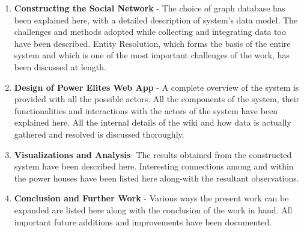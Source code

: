 \begin{enumerate}
    
    \item \textbf{Constructing the Social Network} -  The choice of graph database has been explained here, with a detailed description of system's data model. The challenges and methods adopted while collecting and integrating data too have been described. Entity Resolution, which forms the basis of the entire system and which is one of the most important challenges of the work, has been discussed at length.
    
    \item \textbf{Design of Power Elites Web App}  -  A complete overview of the system is provided with all the possible actors. All the components  of the system, their functionalities and interactions with the actors of the system have been explained here. All the internal details of the wiki and how data is actually gathered and resolved is discussed thoroughly.

    \item \textbf{Visualizations and Analysis}- The results obtained from the constructed system have been described here. Interesting connections among and within the power houses have been listed here along-with the resultant observations. 

    \item \textbf{Conclusion and Further Work} - Various ways the present work can be expanded are listed here along with the conclusion of the work in hand. All important future additions and improvements have been documented.

\end{enumerate}
